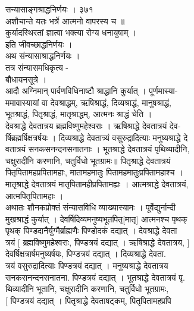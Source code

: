 \documentclass[11pt, openany]{book}
\begin{document}
{{{{{{{{{{{{{{{{{{{{{{{{{{{{{{{{{{{{{{{{{{{{{{{{{{{{{{{{{{{{{{{{{{{{{{{{{{{{{{{{{{{{{{{{{{{{{{{{{{{{{{{{{{{{{{{{{{{{{{{{{{{{{{{{{{{{{{{{{{{{{{{{{{{{{{{{{{{{{{{ सन्यासाङ्गश्राद्धनिर्णयः । ३७१\\
अशौचान्ते यतः }{भर्त्रे}{ आत्मनो वापरस्य च ॥\\
कुर्यादस्थिरतां ज्ञात्वा भक्त्या रोग्य धनायुषाम् ।\\
}{इति}{ जीवच्छाद्धनिर्णयः ।\\
अथ संन्यासाश्राद्धनिर्णयः ।\\
तत्र संन्यासमधिकृत्य -\\
बौधायनसूत्रे ।\\
}{आदौ}{ अग्निमान् पार्वणविधिनाष्टौ श्राद्धानि कुर्यात् । पूर्णमास्या-\\
ममावास्यायां वा देवश्राद्धम्, ऋषिश्राद्धं, दिव्यश्राद्धं,
मानुषश्राद्धं,\\
भूतश्राद्धं, पितृश्राद्धं, मातृश्राद्धम्, आत्मनः श्राद्धं चेति ।\\
देवश्राद्धे देवतात्रय ब्रह्मविष्णुमहेश्वराः । ऋषिश्राद्धे देवतात्रयं
देव-\\
र्षिब्रह्मर्षिक्षत्रर्षयः । दिव्यश्राद्धे देवतात्र्यं वसुरुद्रादित्याः
\textbar{} मनुष्यश्राद्धे दे\\
वतात्रयं सनकसनन्दनसनातनाः । भूतश्राद्धे देवतात्रयं पृथिव्यादीनि,\\
[भूतानि] चक्षुरादीनि करणानि, चतुर्विधो भूतग्रामः॥ पितृश्राद्धे
देवतात्रयं\\
पितृपितामहप्रपितामहाः, मातामहमातुः पितामहमातुःप्रपितामहाश्च ।\\
मातृश्राद्धे देवतात्रयं मातृपितामहीप्रपितामह्यः । आत्मश्राद्धे
देवतात्रयं,\\
आत्मपितृपितामहाः ।\\
अथातः शौनकप्रोक्तं संन्यासविधि व्याख्यास्यामः । पूर्वेद्युर्नान्दी\\
मुखश्राद्धं कुर्यात् । देवर्षिदिव्यमनुष्यभूतपितृ[मातृ] आत्मनश्च
पृथक्\\
पृथक् पिण्डदानैर्युग्मैर्ब्राह्मणैः पिण्डोदकं दद्यात् । देवश्राद्धे
देवता\\
त्रयं [ ब्रह्मविष्णुमहेश्वराः, पिण्डत्रयं दद्यात् । ऋषिश्राद्धे
देवतात्रय, {]}\\
देवर्षिक्षत्रार्षमनुष्यर्षयः, पिण्डत्रयं दद्यात् । दिव्यश्राद्धे
देवता.\\
त्रयं वसुरुद्रादित्याः पिण्डत्रयं दद्यात् । मनुष्यश्राद्धे देवतात्रय\\
सनकसनन्दनसनातना. पिण्डत्रयं दद्यात् । भूतश्राद्धे देवतात्रयं पृ.\\
थिव्यादीनि भूतानि, चक्षुरादीनि करणानि, चतुर्विधो भूतग्रामः,\\
{[} पिण्डत्रयं दद्यात् । पितृश्राद्धे देवताषट्कम्, पितृपितामहप्रपि\\
}}}}}}}}}}}}}}}}}}}}}}}}}}}}}}}}}}}}}}}}}}}}}}}}}}}}}}}}}}}}}}}}}}}}}}}}}}}}}}}}}}}}}}}}}}}}}}}}}}}}}}}}}}}}}}}}}}}}}}}}}}}}}}}}}}}}}}}}}}}}}}}}}}}}}}}}}}}}}}}
\end{document}
